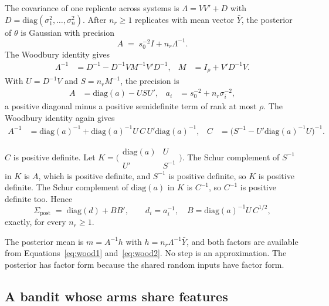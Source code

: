 \documentclass[11pt]{article}
\begin{document}
The covariance of one replicate across systems is
$\Lambda = V V' + D$ with $D = \mathrm{diag}(\sigma_1^2, \dots,
\sigma_n^2)$. After $n_r \ge 1$ replicates with mean vector
$\bar{Y}$, the posterior of $\theta$ is Gaussian with precision
\begin{equation}
A \;=\; s_0^{-2} I + n_r \Lambda^{-1}.
\label{eq:precision}
\end{equation}
The Woodbury identity gives
\begin{align}
\Lambda^{-1} &= D^{-1} - D^{-1} V M^{-1} V' D^{-1},
& M &= I_\rho + V' D^{-1} V.
\label{eq:wood1}
\end{align}
With $U = D^{-1} V$ and $S = n_r M^{-1}$, the precision is
\begin{align}
A &= \mathrm{diag}(a) - U S U', & a_i &= s_0^{-2} + n_r \sigma_i^{-2},
\label{eq:diagminus}
\end{align}
a positive diagonal minus a positive semidefinite term of rank at
most $\rho$. The Woodbury identity again gives
\begin{align}
A^{-1} &= \mathrm{diag}(a)^{-1} + \mathrm{diag}(a)^{-1} U \, C \, U'
\mathrm{diag}(a)^{-1},
& C &= \bigl(S^{-1} - U' \mathrm{diag}(a)^{-1} U\bigr)^{-1}.
\label{eq:wood2}
\end{align}

$C$ is positive definite. Let $K = \bigl(\begin{smallmatrix}
\mathrm{diag}(a) & U \\ U' & S^{-1} \end{smallmatrix}\bigr)$. The
Schur complement of $S^{-1}$ in $K$ is $A$, which is positive
definite, and $S^{-1}$ is positive definite, so $K$ is positive
definite. The Schur complement of $\mathrm{diag}(a)$ in $K$ is
$C^{-1}$, so $C^{-1}$ is positive definite too. Hence
\begin{equation}
\Sigma_{\text{post}} \;=\; \mathrm{diag}(d) + B B', \qquad
d_i = a_i^{-1}, \quad
B = \mathrm{diag}(a)^{-1} U \, C^{1/2},
\label{eq:postform}
\end{equation}
exactly, for every $n_r \ge 1$.

The posterior mean is $m = A^{-1} h$
with $h = n_r \Lambda^{-1} \bar{Y}$, and both factors are available
from Equations~\eqref{eq:wood1} and~\eqref{eq:wood2}. No step is an
approximation. The posterior has factor form because the shared
random inputs have factor form.

\subsection{A bandit whose arms share features}
\label{sec:bandit-posterior}
\end{document}
